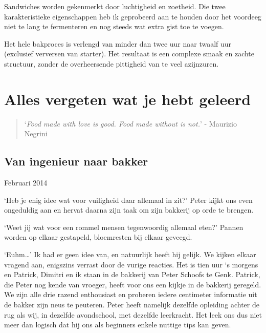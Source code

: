 \documentclass[
  11pt,
  dutch,
]{memoir}
\begin{document}
Sandwiches worden gekenmerkt door luchtigheid en zoetheid. Die twee
karakteristieke eigenschappen heb ik geprobeerd aan te houden door het
voordeeg niet te lang te fermenteren en nog steeds wat extra gist toe te
voegen.

Het hele bakproces is verlengd van minder dan twee uur naar twaalf uur
(exclusief verversen van starter). Het resultaat is een complexe smaak
en zachte structuur, zonder de overheersende pittigheid van te veel
azijnzuren.

\hypertarget{alles-vergeten-wat-je-hebt-geleerd}{%
\chapter{Alles vergeten wat je hebt
geleerd}\label{alles-vergeten-wat-je-hebt-geleerd}}

\label{vergeten}

\begin{quote}
`\emph{Food made with love is good. \newline Food made without is not.}'
- Maurizio Negrini
\end{quote}

\hypertarget{van-ingenieur-naar-bakker}{%
\section{Van ingenieur naar bakker}\label{van-ingenieur-naar-bakker}}

\begin{flushright}
Februari 2014
\end{flushright}

`Heb je enig idee wat voor vuiligheid daar allemaal in zit?' Peter kijkt
ons even ongeduldig aan en hervat daarna zijn taak om zijn bakkerij op
orde te brengen.

`Weet jij wat voor een rommel mensen tegenwoordig allemaal eten?' Pannen
worden op elkaar gestapeld, bloemresten bij elkaar geveegd.

`Euhm\ldots{}' Ik had er geen idee van, en natuurlijk heeft hij gelijk.
We kijken elkaar vragend aan, enigszins verrast door de vurige reacties.
Het is tien uur `s morgens en Patrick, Dimitri en ik staan in de
bakkerij van Peter Schoofs te Genk. Patrick, die Peter nog kende van
vroeger, heeft voor ons een kijkje in de bakkerij geregeld. We zijn alle
drie razend enthousiast en proberen iedere centimeter informatie uit de
bakker zijn neus te peuteren. Peter heeft namelijk dezelfde opleiding
achter de rug als wij, in dezelfde avondschool, met dezelfde leerkracht.
Het leek ons dus niet meer dan logisch dat hij ons als beginners enkele
nuttige tips kan geven.
\end{document}

